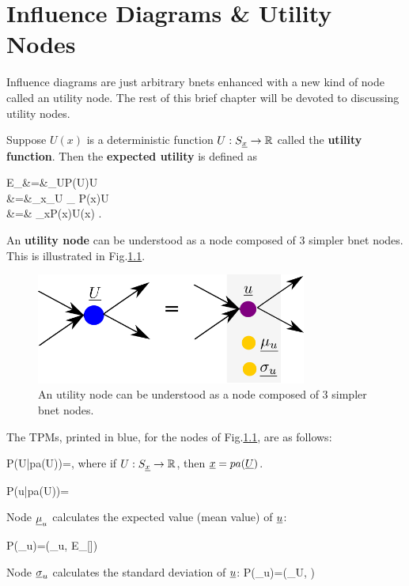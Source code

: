 \chapter{Influence Diagrams \& Utility Nodes}
\label{ch-inf-dia}

Influence diagrams are
just arbitrary bnets
enhanced with a 
new kind of node called an utility node.
The rest
of this brief chapter  will 
be devoted to discussing utility nodes.

Suppose $U(x)$ is a deterministic 
function $U:S_{\underline{x}}\rightarrow { \mathbb{R}}$
called the {\bf utility function}.
Then the {\bf expected utility}
is defined as


\beqa
E_\rvU[\rvU]&=&\sum_UP(U)U
\\
&=&\sum_x\sum_U
_
{\delta[U, U(x)]}P(x)U
\\
&=&
\sum_xP(x)U(x)
\;.
\eeqa

An {\bf utility node}
can be
understood
as a node
composed of 3 simpler bnet nodes.
This
is illustrated in Fig.\ref{fig-util-node}.

\begin{figure}[h!]
\centering
\includegraphics[width=3.5in]
{inf-dia/util-node.png}
\caption{An utility node
can be
understood
as a node 
composed of 3 simpler bnet nodes.} 
\label{fig-util-node}
\end{figure}

The TPMs,
printed in blue,
for the nodes
of Fig.\ref{fig-util-node},
are as follows:

\beq\color{blue}
P(U|pa(U))=\delta[U, U(pa(U))]
\;,
\eeq
where if $U:S_{\underline{x}}\rightarrow { \mathbb{R}}$,
then ${\underline{x}}=pa({\underline{U}})$.

\beq\color{blue}
P(u|pa(U))=
\delta[u, U(pa(U))]
\eeq

Node $\underline{\mu}_u$
calculates the
expected value (mean value) of ${\underline{u}}$:

\beq\color{blue}
P(\mu_u)=\delta(\mu_u,
E_{\rvu}[\rvu])
\eeq

Node $\underline{\sigma}_u$
calculates the
standard deviation of ${\underline{u}}$:
\beq\color{blue}
P(\sigma_u)=\delta(\sigma_U,
)
\eeq

